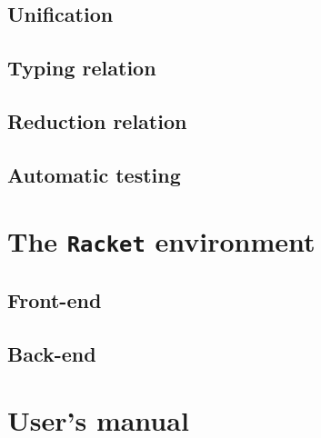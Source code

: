 \documentclass[inz, english, shortabstract]{iithesis}
\newcommand{\Racket}{\texttt{Racket}}
\begin{document}
\section{Unification}\label{sec:unification}

\section{Typing relation}

\section{Reduction relation}

\section{Automatic testing}


\chapter{The \Racket{} environment}\label{ch:racket}

\section{Front-end}

\section{Back-end}

\chapter{User's manual}\label{ch:manual}

\printbibliography

\end{document}
